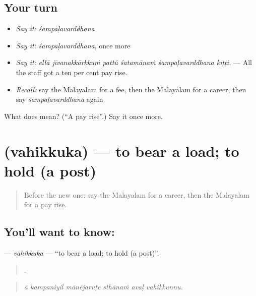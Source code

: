 \subsection*{Your turn}
\begin{itemize}
\raggedright
  \item \emph{Say it:} \emph{śampaḷavarddhana}
  \item \emph{Say it:} \emph{śampaḷavarddhana}, once more
  \item \emph{Say it:} \emph{ellā jīvanakkārkkuṁ pattŭ śatamānaṁ śampaḷavarddhana kiṭṭi.} — All the staff got a ten per cent pay rise.
  \item \emph{Recall:} say the Malayalam for a fee, then the Malayalam for a career, then say \emph{śampaḷavarddhana} again
\end{itemize}

\begin{tcolorbox}[breakable,colback=teal!4,colframe=teal!35!black,title={Before you move on}]
What does  mean? (\textquotedblleft{}A pay rise\textquotedblright{}.) Say it once more.
\end{tcolorbox}
\section[\texorpdfstring{\ml{വഹിക്കുക} (vahikkuka)}{വഹിക്കുക (vahikkuka)}]{ (vahikkuka) — to bear a load; to hold (a post)}

\label{lesson:ML-C549-vahikkuka}



\begin{quote}
Before the new one: say the Malayalam for a career, then the Malayalam for a pay rise.
\end{quote}

\subsection*{You'll want to know: }
\textbf{} — \emph{vahikkuka} — \textquotedblleft{}to bear a load; to hold (a post)\textquotedblright{}.

\begin{quote}
     .
\end{quote}

\begin{quote}
\emph{ā kampaniyil mānējaruṭe sthānaṁ avaḷ vahikkunnu.}
\end{quote}

